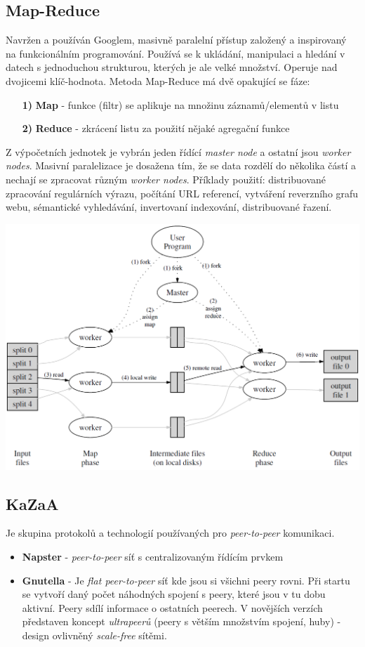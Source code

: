 \documentclass{scrreprt}
\begin{document}
\subsection{Map-Reduce}
Navržen a používán Googlem, masivně paralelní přístup založený a inspirovaný na funkcionálním programování. Používá se k ukládání, manipulaci a hledání v datech s jednoduchou strukturou, kterých je ale velké množství. Operuje nad dvojicemi klíč-hodnota. Metoda Map-Reduce má dvě opakující se fáze:
\begin{itemize}
\item[\textbf{1)}] \textbf{Map} - funkce (filtr) se aplikuje na množinu záznamů/elementů v listu
\item[\textbf{2)}] \textbf{Reduce} - zkrácení listu za použití nějaké agregační funkce
\end{itemize}
Z výpočetních jednotek je vybrán jeden řídící \emph{master node} a ostatní jsou \emph{worker nodes}. Masivní paralelizace je dosažena tím, že se data rozdělí do několika částí a nechají se zpracovat různým \emph{worker nodes}. Příklady použití: distribuované zpracování regulárních výrazu, počítání URL referencí, vytváření reverzního grafu webu, sémantické vyhledávání, invertovaní indexování, distribuované řazení.

\begin{center}
\includegraphics[width=\linewidth]{img/map_reduce}
\end{center}

\subsection{KaZaA}
Je skupina protokolů a technologií používaných pro \emph{peer-to-peer} komunikaci.
\begin{itemize}
\item \textbf{Napster} - \emph{peer-to-peer} síť s centralizovaným řídícím prvkem
\item \textbf{Gnutella} - Je \emph{flat peer-to-peer} síť kde jsou si všichni peery rovni. Při startu se vytvoří daný počet náhodných spojení s peery, které jsou v tu dobu aktivní. Peery sdílí informace o ostatních peerech. V novějších verzích představen koncept \emph{ultrapeerů} (peery s větším množstvím spojení, huby) - design ovlivněný \emph{scale-free} sítěmi.
\end{itemize}
\end{document}
